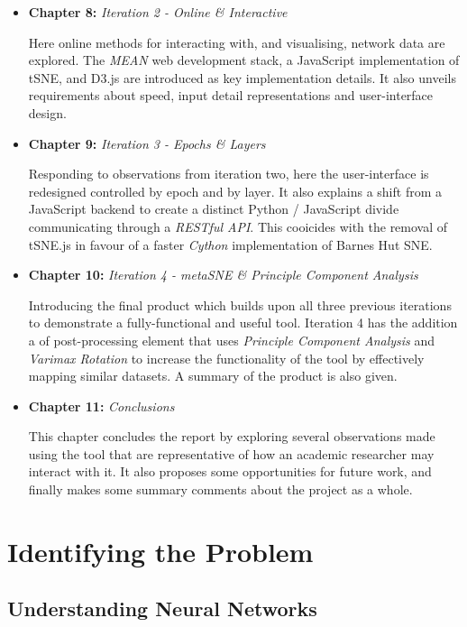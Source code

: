 \documentclass[a4paper,11pt,titlepage]{article}
\begin{document}
\begin{itemize}
	\item \textbf{Chapter 8:} \textit{Iteration 2 - Online \& Interactive}
	\par 
	Here online methods for interacting with, and visualising, network data are explored. The \textit{MEAN} web development stack, a JavaScript implementation of tSNE, and D3.js are introduced as key implementation details. It also unveils requirements about speed, input detail representations and user-interface design.
	\item \textbf{Chapter 9:} \textit{Iteration 3 - Epochs \& Layers}
	\par 
	Responding to observations from iteration two, here the user-interface is redesigned controlled by epoch and by layer. It also explains a shift from a JavaScript backend to create a distinct Python / JavaScript divide communicating through a \textit{RESTful API}. This cooicides with the removal of tSNE.js in favour of a faster \textit{Cython} implementation of Barnes Hut SNE.
	\item \textbf{Chapter 10:} \textit{Iteration 4 - metaSNE \& Principle Component Analysis}
	\par 
	Introducing the final product which builds upon all three previous iterations to demonstrate a fully-functional and useful tool. Iteration 4 has the addition a of post-processing element that uses \textit{Principle Component Analysis} and \textit{Varimax Rotation} to increase the functionality of the tool by effectively mapping similar datasets. A summary of the product is also given.
	\item \textbf{Chapter 11:} \textit{Conclusions}
	\par 
	This chapter concludes the report by exploring several observations made using the tool that are representative of how an academic researcher may interact with it. It also proposes some opportunities for future work, and finally makes some summary comments about the project as a whole.
	\end{itemize}
\clearpage

\section{Identifying the Problem}

	\subsection{Understanding Neural Networks}
		
\end{document}
